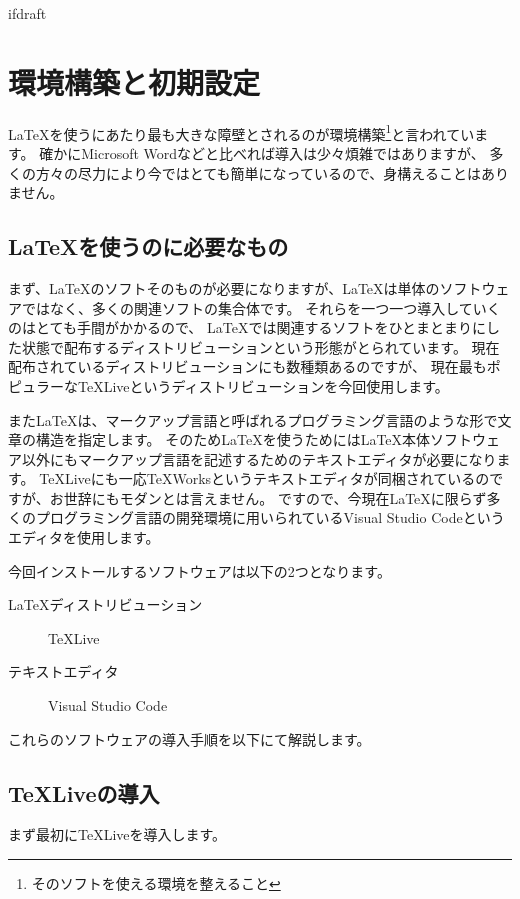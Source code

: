 \expandafter\ifx\csname ifdraft\endcsname\relax
    
    \graphicspath{{./figure/}}

\fi

\chapter{環境構築と初期設定}
	\LaTeX を使うにあたり最も大きな障壁とされるのが環境構築\footnote{そのソフトを使える環境を整えること}と言われています。
	確かにMicrosoft Wordなどと比べれば導入は少々煩雑ではありますが、
	多くの方々の尽力により今ではとても簡単になっているので、身構えることはありません。

	\section{\LaTeX を使うのに必要なもの}
		まず、\LaTeX のソフトそのものが必要になりますが、\LaTeX は単体のソフトウェアではなく、多くの関連ソフトの集合体です。
		それらを一つ一つ導入していくのはとても手間がかかるので、
		\LaTeX では関連するソフトをひとまとまりにした状態で配布するディストリビューションという形態がとられています。
		現在配布されているディストリビューションにも数種類あるのですが、
		現在最もポピュラーな\TeX Liveというディストリビューションを今回使用します。

		また\LaTeX は、マークアップ言語と呼ばれるプログラミング言語のような形で文章の構造を指定します。
		そのため\LaTeX を使うためには\LaTeX 本体ソフトウェア以外にもマークアップ言語を記述するためのテキストエディタが必要になります。
		\TeX Liveにも一応\TeX Worksというテキストエディタが同梱されているのですが、お世辞にもモダンとは言えません。
		ですので、今現在\LaTeX に限らず多くのプログラミング言語の開発環境に用いられているVisual Studio Codeというエディタを使用します。

		今回インストールするソフトウェアは以下の2つとなります。
		\begin{description}
			\item[\LaTeX ディストリビューション] \TeX Live
			\item[テキストエディタ] Visual Studio Code
		\end{description}
		これらのソフトウェアの導入手順を以下にて解説します。

	\section{\TeX Liveの導入}
		まず最初に\TeX Liveを導入します。

